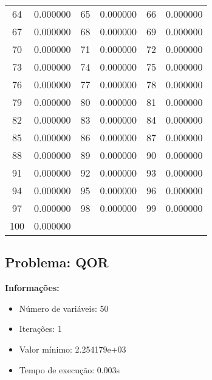 \documentclass[12pt]{article}
\begin{document}
\begin{longtable}{@{}cc|cc|cc@{}}
64 & 0.000000 & 65 & 0.000000 & 66 & 0.000000 \\
67 & 0.000000 & 68 & 0.000000 & 69 & 0.000000 \\
70 & 0.000000 & 71 & 0.000000 & 72 & 0.000000 \\
73 & 0.000000 & 74 & 0.000000 & 75 & 0.000000 \\
76 & 0.000000 & 77 & 0.000000 & 78 & 0.000000 \\
79 & 0.000000 & 80 & 0.000000 & 81 & 0.000000 \\
82 & 0.000000 & 83 & 0.000000 & 84 & 0.000000 \\
85 & 0.000000 & 86 & 0.000000 & 87 & 0.000000 \\
88 & 0.000000 & 89 & 0.000000 & 90 & 0.000000 \\
91 & 0.000000 & 92 & 0.000000 & 93 & 0.000000 \\
94 & 0.000000 & 95 & 0.000000 & 96 & 0.000000 \\
97 & 0.000000 & 98 & 0.000000 & 99 & 0.000000 \\
100 & 0.000000 &  &  &  &  \\

\end{longtable}


\newpage            
\subsection{Problema: QOR}

\textbf{Informações:}
\begin{itemize}
\item Número de variáveis: 50
\item Iterações: 1
\item Valor mínimo: 2.254179e+03
\item Tempo de execução: 0.003s
\end{itemize}
\end{document}
